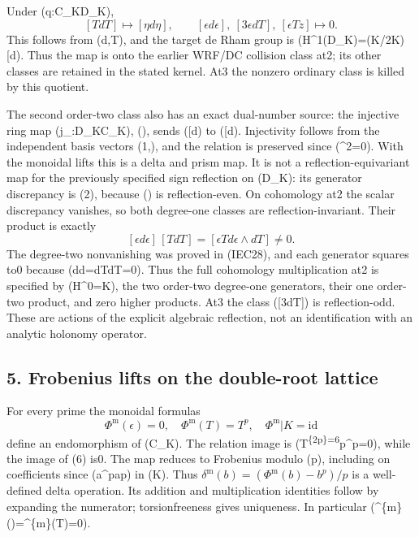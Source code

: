 \documentclass[
  10pt,
]{article}
\begin{document}
Under (q:C\_K\to D\_K), \[
[T dT]\longmapsto[\eta d\eta],\qquad
[\epsilon d\epsilon],\ [3\epsilon dT],\ [\epsilon Tz]\longmapsto0.
\tag{IEC29}
\] This follows from (d\epsilon{},T\mapsto\eta), and the target de
Rham group is (H\^{}1(D\_K)=(K/2K){[}\eta d\eta{]}). Thus the map is
onto the earlier WRF/DC collision class at2; its other classes are
retained in the stated kernel. At3 the nonzero ordinary class is killed
by this quotient.

The second order-two class also has an exact dual-number source: the
injective ring map (j\_\epsilon:D\_K\to C\_K), (\eta\mapsto\epsilon),
sends ({[}\eta d\eta{]}) to ({[}\epsilon d\epsilon{]}). Injectivity
follows from the independent basis vectors (1,\epsilon), and the
relation is preserved since (\epsilon\^{}2=0). With the monoidal lifts
this is a delta and prism map. It is not a reflection-equivariant map
for the previously specified sign reflection on (D\_K): its generator
discrepancy is (2\epsilon), because (\epsilon) is reflection-even. On
cohomology at2 the scalar discrepancy vanishes, so both degree-one
classes are reflection-invariant. Their product is exactly \[
[\epsilon d\epsilon]\,[TdT]=[\epsilon T d\epsilon\wedge dT]\ne0.
\tag{IEC60}
\] The degree-two nonvanishing was proved in (IEC28), and each generator
squares to0 because (d\epsilon\wedge d\epsilon=dT\wedge dT=0). Thus the
full cohomology multiplication at2 is specified by (H\^{}0=K), the two
order-two degree-one generators, their one order-two product, and zero
higher products. At3 the class ({[}3\epsilon dT{]}) is reflection-odd.
These are actions of the explicit algebraic reflection, not an
identification with an analytic holonomy operator.

\subsection{5. Frobenius lifts on the double-root
lattice}\label{frobenius-lifts-on-the-double-root-lattice}

For every prime the monoidal formulas \[
\Phi^{\mathrm m}(\epsilon)=0,\quad \Phi^{\mathrm m}(T)=T^p,
\quad\Phi^{\mathrm m}|K=\mathrm{id}
\tag{IEC30}
\] define an endomorphism of (C\_K). The relation image is
(T\textsuperscript{\{2p\}=6}p\epsilon\^{}p=0), while the image of
(6\epsilon) is0. The map reduces to Frobenius modulo (p), including on
coefficients since (a\^{}p\equiv a\pmod p) in (K). Thus
\(\delta^{\mathrm m}(b)=(\Phi^{\mathrm m}(b)-b^p)/p\) is a well-defined
delta operation. Its addition and multiplication identities follow by
expanding the numerator; torsionfreeness gives uniqueness. In particular
(\delta\^{}\{\mathrm m\}(\epsilon)=\delta\^{}\{\mathrm m\}(T)=0).
\end{document}
